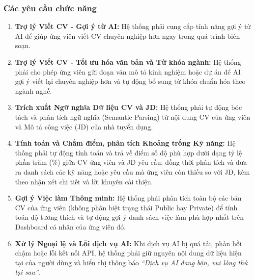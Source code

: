 \subsubsection{Các yêu cầu chức năng}

\begin{enumerate}[label=\bfseries REQ-AI-\arabic*:, leftmargin=2.5cm]
    \item \textbf{Trợ lý Viết CV - Gợi ý từ AI:} Hệ thống phải cung cấp tính năng gợi ý từ AI để giúp ứng viên viết CV chuyên nghiệp hơn ngay trong quá trình biên soạn.
    \item \textbf{Trợ lý Viết CV - Tối ưu hóa văn bản và Từ khóa ngành:} Hệ thống phải cho phép ứng viên gửi đoạn văn mô tả kinh nghiệm hoặc dự án để AI gợi ý viết lại chuyên nghiệp hơn và tự động bổ sung từ khóa chuẩn hóa theo ngành nghề.
    \item \textbf{Trích xuất Ngữ nghĩa Dữ liệu CV và JD:} Hệ thống phải tự động bóc tách và phân tích ngữ nghĩa (Semantic Parsing) từ nội dung CV của ứng viên và Mô tả công việc (JD) của nhà tuyển dụng.
    \item \textbf{Tính toán và Chấm điểm, phân tích Khoảng trống Kỹ năng:} Hệ thống phải tự động tính toán và trả về điểm số độ phù hợp dưới dạng tỷ lệ phần trăm (\%) giữa CV ứng viên và JD yêu cầu; đồng thời phân tích và đưa ra danh sách các kỹ năng hoặc yêu cầu mà ứng viên còn thiếu so với JD, kèm theo nhận xét chi tiết và lời khuyên cải thiện.
    \item \textbf{Gợi ý Việc làm Thông minh:} Hệ thống phải phân tích toàn bộ các bản CV của ứng viên (không phân biệt trạng thái Public hay Private) để tính toán độ tương thích và tự động gợi ý danh sách việc làm phù hợp nhất trên Dashboard cá nhân của ứng viên đó.
    \item \textbf{Xử lý Ngoại lệ và Lỗi dịch vụ AI:} Khi dịch vụ AI bị quá tải, phản hồi chậm hoặc lỗi kết nối API, hệ thống phải giữ nguyên nội dung dữ liệu hiện tại của người dùng và hiển thị thông báo \textit{\textquotedblleft Dịch vụ AI đang bận, vui lòng thử lại sau\textquotedblright}.
\end{enumerate}
